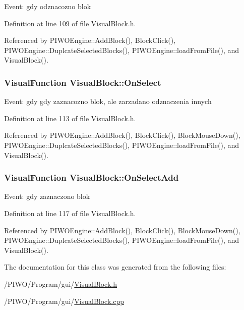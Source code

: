 Event: gdy odznacozno blok 

Definition at line 109 of file VisualBlock.h.

Referenced by PIWOEngine::AddBlock(), BlockClick(), PIWOEngine::DuplcateSelectedBlocks(), PIWOEngine::loadFromFile(), and VisualBlock().\hypertarget{classVisualBlock_425f00a0257fc0f25e01b8e4eb24f3f7}{
\subsubsection[OnSelect]{\setlength{\rightskip}{0pt plus 5cm}VisualFunction {\bf VisualBlock::OnSelect}}}
\label{classVisualBlock_425f00a0257fc0f25e01b8e4eb24f3f7}


Event: gdy gdy zaznacozno blok, ale zarzadano odznaczenia innych 

Definition at line 113 of file VisualBlock.h.

Referenced by PIWOEngine::AddBlock(), BlockClick(), BlockMouseDown(), PIWOEngine::DuplcateSelectedBlocks(), PIWOEngine::loadFromFile(), and VisualBlock().\hypertarget{classVisualBlock_9398455ed1a288276ddc1845cd409d9f}{
\subsubsection[OnSelectAdd]{\setlength{\rightskip}{0pt plus 5cm}VisualFunction {\bf VisualBlock::OnSelectAdd}}}
\label{classVisualBlock_9398455ed1a288276ddc1845cd409d9f}


Event: gdy zaznaczono blok 

Definition at line 117 of file VisualBlock.h.

Referenced by PIWOEngine::AddBlock(), BlockClick(), BlockMouseDown(), PIWOEngine::DuplcateSelectedBlocks(), PIWOEngine::loadFromFile(), and VisualBlock().

The documentation for this class was generated from the following files:\begin{CompactItemize}
\item 
/PIWO/Program/gui/\hyperlink{VisualBlock_8h}{VisualBlock.h}\item 
/PIWO/Program/gui/\hyperlink{VisualBlock_8cpp}{VisualBlock.cpp}\end{CompactItemize}
